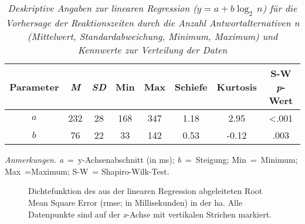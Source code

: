 \documentclass[11pt, twoside, a4paper]{book}		%
\begin{document}
\begin{table}[htbp]
	\centering
	\captionsetup{labelsep = none}
	\caption[Deskriptive Angaben zur ]{\newline  \textit{Deskriptive Angaben zur linearen Regression ($y=a + b\log_{2}\,n$) für die Vorhersage der Reaktionszeiten durch die Anzahl Antwortalternativen n (Mittelwert, Standardabweichung, Minimum, Maximum) und Kennwerte zur Verteilung der Daten} \vspace{.2cm}}
	\label{tab:hick_linear_model}
		\begin{threeparttable}
			\begin{tabular}{
					c
					S[table-format = 2.0]
					S[table-format = 2.0]
					S[table-format = 3.0]
					S[table-format = 3.0]
					S[table-format = 1.2]
					S[table-format = 1.2]
					S[table-format = <0.3, add-integer-zero=false]
				}
			\hline
			Parameter	& 	\textit{M}	& \textit{SD}	&	{Min}	&	{Max} 	&	{Schiefe}	&	{Kurtosis} & {S-W \textit{p}-Wert}	\\
			\hline
			$a$			&	232			&	28			&	168		&	347		&	1.18		&	2.95		& 		<.001			\\
			$b$			&	76			&	22			&	33		&	142		&	0.53		&	-0.12		& 		.003			\\
			\hline
			\end{tabular}

			\begin{tablenotes}[flushleft]
				\footnotesize				%
				\setlength{}	%
				\item \textit{Anmerkungen.} \textit{a}~=~y-Achsenabschnitt (in ms); \textit{b}~=~Steigung; Min~=~Minimum; Max~=Maximum; S-W~= Shapiro-Wilk-Test.
			\end{tablenotes}
		\end{threeparttable}
\end{table}


\begin{figure}[t]
	\centering
	\begin{adjustbox}{width=1\textwidth}
		
	\end{adjustbox}
	\caption[Dichtefunktion des RMSE]{Dichtefunktion des aus der linearen Regression abgeleiteten Root Mean Square Error (\gls{rmse}; in Millisekunden) in der \gls{ha}.  Alle Datenpunkte sind auf der \textit{x}-Achse mit vertikalen Strichen markiert.}
	\label{fig:hick_rmse_density}
\end{figure}
\end{document}
